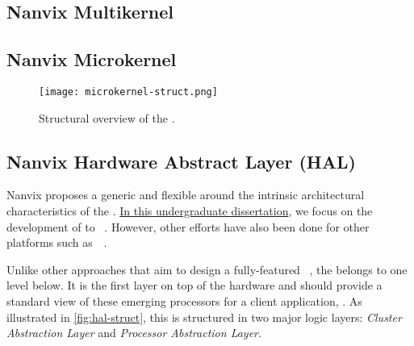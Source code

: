 
	\subsection{Nanvix Multikernel}
	\label{sec.multikernel}

	\subsection{Nanvix Microkernel}
	\label{sec.microkernel}

		\begin{figure}[t]
			\centering%
			\caption{Structural overview of the \microkernel.}%
			\label{fig:microkernel-struct}%
			\texttt{[image: microkernel-struct.png]}%
		\end{figure}

	\subsection{Nanvix Hardware Abstract Layer (HAL)}
	\label{sec.hal}


		Nanvix \os proposes a generic and flexible \hal around the
		intrinsic architectural characteristics of the \lightweight \manycores.
		\underline{In this undergraduate dissertation}, we focus on the development of \hal
		to \mppa~\cite{DeDinechin2013-1}.
		However, other efforts have also been done for other platforms such
		as~\optimsoc~\cite{Wallentowitz2013}.

		Unlike other approaches that aim to design a fully-featured \os~\cite{Baumann2009,kluge2014,nightingale2009,rhoden2011},
		the \hal belongs to one level below.
		It is the first layer on top of the hardware and should provide a standard
		view of these emerging processors for a client application, \eg \os.
		As illustrated in \autoref{fig:hal-struct}, this \hal is structured in
		two major logic layers: \textit{Cluster Abstraction Layer} and \textit{Processor Abstraction Layer}.

